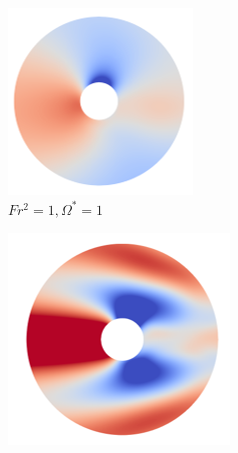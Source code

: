 \begin{figure}
    \begin{subfigure}[b]{0.25\textwidth}
        \centering
        \includegraphics[width=\textwidth]{images/circle/ps1fs1.png}
        \caption{$Fr^2 = 1, \Omega^{\ast} = 1$}
        \label{fig:ps1fs1}
    \end{subfigure}
    \hfill
    \begin{subfigure}[b]{0.25\textwidth}
        \centering
        \includegraphics[width=\textwidth]{images/circle/ps1fs0p1.png}

\end{subfigure}
\end{figure}
